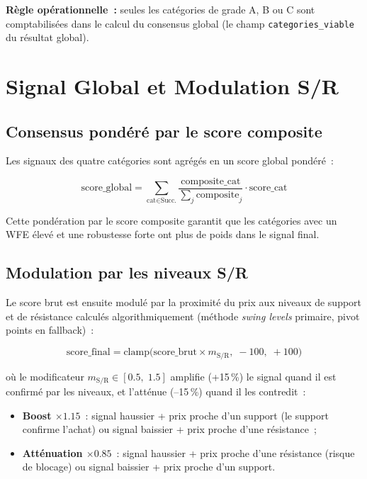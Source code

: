 \textbf{Règle opérationnelle~:} seules les catégories de grade A, B ou C sont
comptabilisées dans le calcul du consensus global (le champ
\texttt{categories\_viable} du résultat global).

\section{Signal Global et Modulation S/R}
\label{sec:wfo_global}

\subsection{Consensus pondéré par le score composite}

Les signaux des quatre catégories sont agrégés en un score global pondéré~:

\begin{equation}
\text{score\_global} = \sum_{\text{cat} \in \text{Succ.}}
\frac{\text{composite\_cat}}{\sum_j \text{composite}_j} \cdot \text{score\_cat}
\label{eq:wfo_global_score}
\end{equation}

Cette pondération par le score composite garantit que les catégories avec un WFE
élevé et une robustesse forte ont plus de poids dans le signal final.

\subsection{Modulation par les niveaux S/R}

Le score brut est ensuite modulé par la proximité du prix aux niveaux de
support et de résistance calculés algorithmiquement (méthode \textit{swing levels}
primaire, pivot points en fallback)~:

\begin{equation}
\text{score\_final} = \text{clamp}\bigl(\text{score\_brut} \times m_{\text{S/R}},\; -100,\; +100\bigr)
\label{eq:sr_modulation}
\end{equation}

où le modificateur $m_{\text{S/R}} \in [0.5,\; 1.5]$ amplifie (+15\,\%) le signal
quand il est confirmé par les niveaux, et l'atténue (--15\,\%) quand il les contredit~:

\begin{itemize}
    \item \textbf{Boost $\times 1.15$}~: signal haussier + prix proche d'un support
    (le support confirme l'achat) ou signal baissier + prix proche d'une résistance~;
    \item \textbf{Atténuation $\times 0.85$}~: signal haussier + prix proche d'une
    résistance (risque de blocage) ou signal baissier + prix proche d'un support.
\end{itemize}

